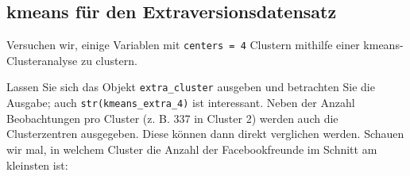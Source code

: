 \documentclass[12pt,ngerman,]{book}
\makeatletter
\newenvironment{Shaded}{\begin{snugshade}}{\end{snugshade}}
\newcommand{\KeywordTok}[1]{\textcolor[rgb]{0.13,0.29,0.53}{\textbf{#1}}}
\newcommand{\DataTypeTok}[1]{\textcolor[rgb]{0.13,0.29,0.53}{#1}}
\newcommand{\DecValTok}[1]{\textcolor[rgb]{0.00,0.00,0.81}{#1}}
\newcommand{\StringTok}[1]{\textcolor[rgb]{0.31,0.60,0.02}{#1}}
\newcommand{\CommentTok}[1]{\textcolor[rgb]{0.56,0.35,0.01}{\textit{#1}}}
\newcommand{\OperatorTok}[1]{\textcolor[rgb]{0.81,0.36,0.00}{\textbf{#1}}}
\newcommand{\NormalTok}[1]{#1}
\newenvironment{kframe}{%
\medskip{}
\setlength{\fboxsep}{.8em}
 \def\at@end@of@kframe{}%
 \ifinner\ifhmode%
  \def\at@end@of@kframe{\end{minipage}}%
  \begin{minipage}{\columnwidth}%
 \fi\fi%
 \def\FrameCommand##1{\hskip\@totalleftmargin \hskip-\fboxsep
 \colorbox{shadecolor}{##1}\hskip-\fboxsep
     \hskip-\linewidth \hskip-\@totalleftmargin \hskip\columnwidth}%
 \MakeFramed {\advance\hsize-\width
   \@totalleftmargin\z@ \linewidth\hsize
   \@setminipage}}%
 {\par\unskip\endMakeFramed%
 \at@end@of@kframe}
\renewenvironment{Shaded}{\begin{kframe}}{\end{kframe}}
\theoremstyle{definition}
\theoremstyle{definition}
\theoremstyle{remark}
\makeatother
\begin{document}
\subsection{kmeans für den
Extraversionsdatensatz}\label{kmeans-fur-den-extraversionsdatensatz}

Versuchen wir, einige Variablen mit \texttt{centers\ =\ 4} Clustern
mithilfe einer kmeans-Clusteranalyse zu clustern.

\begin{Shaded}
\end{Shaded}

Lassen Sie sich das Objekt \texttt{extra\_cluster} ausgeben und
betrachten Sie die Ausgabe; auch \texttt{str(kmeans\_extra\_4)} ist
interessant. Neben der Anzahl Beobachtungen pro Cluster (z. B. 337 in
Cluster 2) werden auch die Clusterzentren ausgegeben. Diese können dann
direkt verglichen werden. Schauen wir mal, in welchem Cluster die Anzahl
der Facebookfreunde im Schnitt am kleinsten ist:

\begin{Shaded}
\end{Shaded}
\end{document}
